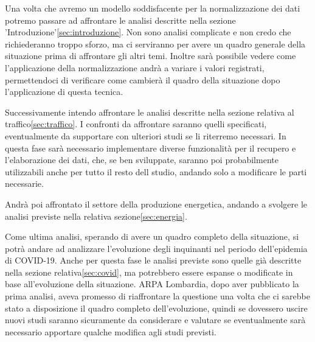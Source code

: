 \documentclass{article}
\begin{document}
Una volta che avremo un modello soddisfacente per la normalizzazione dei dati potremo passare ad affrontare le analisi descritte nella sezione 'Introduzione'\ref{sec:introduzione}. Non sono analisi complicate e non credo che richiederanno troppo sforzo, ma ci serviranno per avere un quadro generale della situazione prima di affrontare gli altri temi. Inoltre sarà possibile vedere come l'applicazione della normalizzazione andrà a variare i valori registrati, permettendoci di verificare come cambierà il quadro della situazione dopo l'applicazione di questa tecnica.

Successivamente intendo affrontare le analisi descritte nella sezione relativa al traffico\ref{sec:traffico}. I confronti da affrontare saranno quelli specificati, eventualmente da supportare con ulteriori studi se li riterremo necessari. In questa fase sarà necessario implementare diverse funzionalità per il recupero e l'elaborazione dei dati, che, se ben sviluppate, saranno poi probabilmente utilizzabili anche per tutto il resto dell studio, andando solo a modificare le parti necessarie.

Andrà poi affrontato il settore della produzione energetica, andando a svolgere le analisi previste nella relativa sezione\ref{sec:energia}.

Come ultima analisi, sperando di avere un quadro completo della situazione, si potrà andare ad analizzare l'evoluzione degli inquinanti nel periodo dell'epidemia di COVID-19. Anche per questa fase le analisi previste sono quelle già descritte nella sezione relativa\ref{sec:covid}, ma potrebbero essere espanse o modificate in base all'evoluzione della situazione. ARPA Lombardia, dopo aver pubblicato la prima analisi\cite{arpaCovid}, aveva promesso di riaffrontare la questione una volta che ci sarebbe stato a disposizione il quadro completo dell'evoluzione, quindi se dovessero uscire nuovi studi saranno sicuramente da considerare e valutare se eventualmente sarà necessario apportare qualche modifica agli studi previsti. 
 

%
%
\label{bib-begin}
\printbibliography
\end{document}
